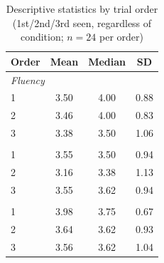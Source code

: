 \begin{table}[htbp]
\centering
\caption{Descriptive statistics by trial order (1st/2nd/3rd seen, regardless of condition; $n = 24$ per order)}
\label{tab:descriptive-stats-by-order}
\begin{tabular}{lccc}
\toprule
Order & Mean & Median & SD \\
\midrule
\multicolumn{4}{l}{\textit{Fluency}} \\
1 & 3.50 & 4.00 & 0.88 \\
2 & 3.46 & 4.00 & 0.83 \\
3 & 3.38 & 3.50 & 1.06 \\
\addlinespace
\multicolumn{4}{l}{\textit{Adapts}} \\
1 & 3.55 & 3.50 & 0.94 \\
2 & 3.16 & 3.38 & 1.13 \\
3 & 3.55 & 3.62 & 0.94 \\
\addlinespace
\multicolumn{4}{l}{\textit{Helpfulness}} \\
1 & 3.98 & 3.75 & 0.67 \\
2 & 3.64 & 3.62 & 0.93 \\
3 & 3.56 & 3.62 & 1.04 \\
\bottomrule
\end{tabular}
\end{table}

